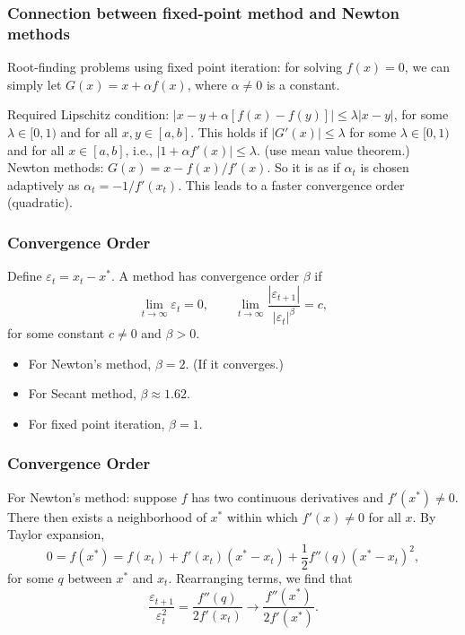  \begin{frame}
  \frametitle{Connection between fixed-point method and Newton methods}

  Root-finding problems using fixed point iteration: for solving $f(x)=0$, we can simply let $G(x)=x+\alpha f(x)$, where $\alpha \neq 0$ is a constant.

  Required Lipschitz condition: $|x - y + \alpha [f(x) - f(y)]| \le \lambda|x-y|$, for some $\lambda \in [0,1)$ and for all $x,y\in [a,b]$. This holds if $|G'(x)|\leq \lambda$ for some $\lambda \in [0,1)$ and for all $x\in [a,b]$, i.e., $|1+\alpha f'(x)|\leq\lambda$. (use mean value theorem.)\\


  Newton methods: $G(x) = x - f(x)/f'(x)$. So it is as if $\alpha_t$ is chosen adaptively as $\alpha_t=-1/f'(x_t)$. This leads to a faster convergence order (quadratic).

  \end{frame}


 \begin{frame}
  \frametitle{Convergence Order}

Define $\varepsilon_t=x_t - x^*$. A method has convergence order $\beta$ if
$$
\lim_{t\rightarrow \infty}\varepsilon_t =0, \qquad
\lim_{t\rightarrow \infty}\frac{|\varepsilon_{t+1}|}{|\varepsilon_t|^\beta} = c,
$$
for some constant $c\neq 0$ and $\beta >0$.

\begin{itemize}
    \item For Newton's method, $\beta=2$. (If it converges.)
    \item For Secant method, $\beta\approx 1.62$.
    \item For fixed point iteration, $\beta = 1$.
\end{itemize}


  \end{frame}



 \begin{frame}[t]
  \frametitle{Convergence Order}

\noindent For Newton's method: suppose $f$ has two continuous derivatives and $f'(x^*)\neq 0$. There then exists a neighborhood of $x^*$ within which $f'(x)\neq 0$ for all $x$. By Taylor expansion,
$$
0 = f(x^*) = f(x_t) + f'(x_t)(x^*-x_t) +\frac{1}{2}f''(q)(x^*-x_t)^2,
$$
for some $q$ between $x^*$ and $x_t$. Rearranging terms, we find that $$
\frac{\varepsilon_{t+1}}{\varepsilon_{t}^2} = \frac{f''(q)}{2f'(x_t)}\rightarrow \frac{f''(x^*)}{2f'(x^*)}.
$$
  \end{frame}

